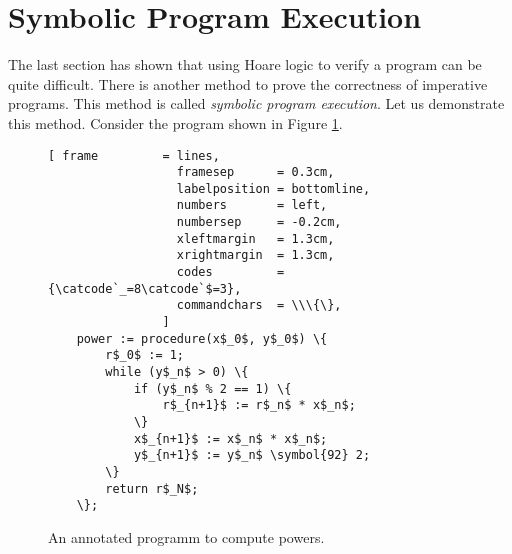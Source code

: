 \section{Symbolic  Program Execution}
The last section has shown that using Hoare logic to verify a program can be quite difficult.
There is another method to prove the correctness of imperative programs.  This method is called
\emph{symbolic program execution}.  Let us demonstrate this method.  Consider the program
shown in Figure \ref{fig:power-iterative-annotated.stlx}.


\begin{figure}[!h]
\centering
\begin{Verbatim}[ frame         = lines, 
                  framesep      = 0.3cm, 
                  labelposition = bottomline,
                  numbers       = left,
                  numbersep     = -0.2cm,
                  xleftmargin   = 1.3cm,
                  xrightmargin  = 1.3cm,
                  codes         = {\catcode`_=8\catcode`$=3},
                  commandchars  = \\\{\},
                ]
    power := procedure(x$_0$, y$_0$) \{
        r$_0$ := 1;
        while (y$_n$ > 0) \{
            if (y$_n$ % 2 == 1) \{
                r$_{n+1}$ := r$_n$ * x$_n$;
            \} 
            x$_{n+1}$ := x$_n$ * x$_n$;
            y$_{n+1}$ := y$_n$ \symbol{92} 2;            
        \} 
        return r$_N$;
    \};
\end{Verbatim}
\vspace*{-0.3cm}
\caption{An annotated programm to compute powers.}
\label{fig:power-iterative-annotated.stlx}
\end{figure} %

